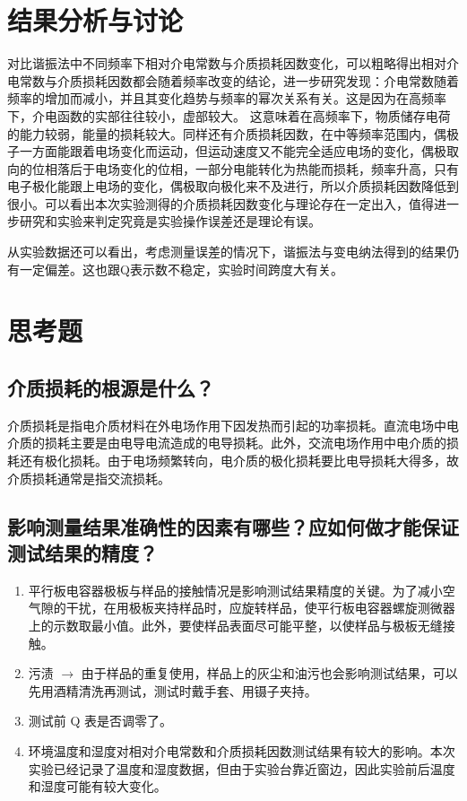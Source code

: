 \documentclass[a4paper,utf8]{article}
\begin{document}
\section{结果分析与讨论}
    对比谐振法中不同频率下相对介电常数与介质损耗因数变化，可以粗略得出相对介电常数与介质损耗因数都会随着频率改变的结论，进一步研究发现：介电常数随着频率的增加而减小，并且其变化趋势与频率的幂次关系有关。这是因为在高频率下，介电函数的实部往往较小，虚部较大。 这意味着在高频率下，物质储存电荷的能力较弱，能量的损耗较大。同样还有介质损耗因数，在中等频率范围内，偶极子一方面能跟着电场变化而运动，但运动速度又不能完全适应电场的变化，偶极取向的位相落后于电场变化的位相，一部分电能转化为热能而损耗，频率升高，只有电子极化能跟上电场的变化，偶极取向极化来不及进行，所以介质损耗因数降低到很小。可以看出本次实验测得的介质损耗因数变化与理论存在一定出入，值得进一步研究和实验来判定究竟是实验操作误差还是理论有误。\par
    从实验数据还可以看出，考虑测量误差的情况下，谐振法与变电纳法得到的结果仍有一定偏差。这也跟Q表示数不稳定，实验时间跨度大有关。
\section{思考题} 
    \subsection{介质损耗的根源是什么？}
        介质损耗是指电介质材料在外电场作用下因发热而引起的功率损耗。直流电场中电介质的损耗主要是由电导电流造成的电导损耗。此外，交流电场作用中电介质的损耗还有极化损耗。由于电场频繁转向，电介质的极化损耗要比电导损耗大得多，故介质损耗通常是指交流损耗。
    \subsection{影响测量结果准确性的因素有哪些？应如何做才能保证测试结果的精度？}
        \begin{enumerate}
            \item 平行板电容器极板与样品的接触情况是影响测试结果精度的关键。为了减小空气隙的干扰，在用极板夹持样品时，应旋转样品，使平行板电容器螺旋测微器上的示数取最小值。此外，要使样品表面尽可能平整，以使样品与极板无缝接触。
            \item 污渍 $\rightarrow $ 由于样品的重复使用，样品上的灰尘和油污也会影响测试结果，可以先用酒精清洗再测试，测试时戴手套、用镊子夹持。
            \item 测试前 Q 表是否调零了。
            \item 环境温度和湿度对相对介电常数和介质损耗因数测试结果有较大的影响。本次实验已经记录了温度和湿度数据，但由于实验台靠近窗边，因此实验前后温度和湿度可能有较大变化。
        \end{enumerate}
\end{document}
